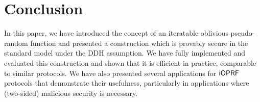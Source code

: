 \section{Conclusion}

In this paper, we have introduced the concept of an iteratable
oblivious pseudo-random function and presented a construction which is
provably secure in the standard model under the DDH assumption.  We
have fully implemented and evaluated this construction and shown that
it is efficient in practice, comparable to similar protocols.  We have
also presented several applications for $\mathsf{i}\mathsf{OPRF}$ protocols that
demonstrate their usefulness, particularly in applications where
(two-sided) malicious security is necessary.